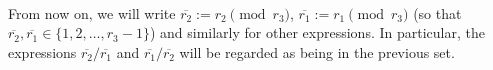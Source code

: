 \documentclass[12pt,a4paper]{article}
\theoremstyle{definition}
\newcommand{\Z}{\mathbb{Z}}
\newcommand{\uo}{\overline{r_2}}
\newcommand{\vo}{\overline{r_1}}
\newcommand{\lcm}{\mathrm{lcm}}
\begin{document}
\paragraph*{}


From now on, we will write $\uo:=r_2\pmod{r_3}$, $\vo:=r_1\pmod{r_3}$ (so that $\uo,\vo\in\{1,2,\dots,r_3-1\}$) and similarly for other expressions. In particular, the expressions $\uo/\vo$ and $\vo/\uo$ will be regarded as being in the previous set.
\end{document}
